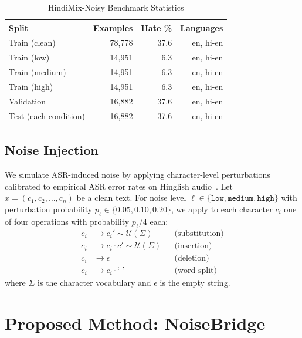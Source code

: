 \documentclass[conference]{IEEEtran}
\begin{document}
\begin{table}[!t]
\caption{HindiMix-Noisy Benchmark Statistics}
\label{tab:benchmark}
\centering
\small
\begin{tabular}{lrrr}
\toprule
\textbf{Split} & \textbf{Examples} & \textbf{Hate \%} & \textbf{Languages} \\
\midrule
Train (clean)  & 78,778 & 37.6 & en, hi-en \\
Train (low)    & 14,951 &  6.3 & en, hi-en \\
Train (medium) & 14,951 &  6.3 & en, hi-en \\
Train (high)   & 14,951 &  6.3 & en, hi-en \\
\midrule
Validation     & 16,882 & 37.6 & en, hi-en \\
Test (each condition) & 16,882 & 37.6 & en, hi-en \\
\bottomrule
\end{tabular}
\end{table}

\subsection{Noise Injection}

We simulate ASR-induced noise by applying character-level perturbations calibrated to empirical ASR error rates on Hinglish audio~\cite{shah2020learning}. Let $x = (c_1, c_2, \ldots, c_n)$ be a clean text. For noise level $\ell \in \{\texttt{low}, \texttt{medium}, \texttt{high}\}$ with perturbation probability $p_\ell \in \{0.05, 0.10, 0.20\}$, we apply to each character $c_i$ one of four operations with probability $p_\ell / 4$ each:
\begin{align}
    c_i &\to c_i' \sim \mathcal{U}(\Sigma) && \text{(substitution)} \\
    c_i &\to c_i \cdot c' \sim \mathcal{U}(\Sigma) && \text{(insertion)} \\
    c_i &\to \epsilon && \text{(deletion)} \\
    c_i &\to c_i \cdot \texttt{` '} && \text{(word split)}
\end{align}
where $\Sigma$ is the character vocabulary and $\epsilon$ is the empty string.

\section{Proposed Method: NoiseBridge}
\label{sec:method}
\end{document}
